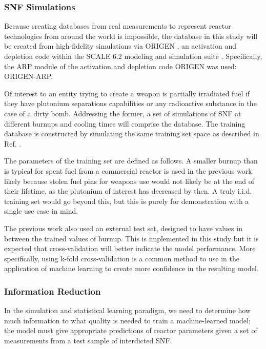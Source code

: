 \subsubsection{\gls{SNF} Simulations}
\label{sec:snfsim}

Because creating databases from real measurements to represent reactor
technologies from around the world is impossible, the database in this study
will be created from high-fidelity simulations via \gls{ORIGEN} \cite{origen},
an activation and depletion code within the SCALE 6.2 modeling and simulation
suite \cite{scale}. Specifically, the ARP module of the activation and
depletion code ORIGEN was used: \gls{ORIGEN-ARP}.

Of interest to an entity trying to create a weapon is partially irradiated fuel
if they have plutonium separations capabilities or any radioactive substance in
the case of a dirty bomb.  Addressing the former, a set of simulations of
\gls{SNF} at different burnups and cooling times will comprise the database.
The training database is constructed by simulating the same training set space
as described in Ref. \cite{dayman_feasibility_2013}. 

The parameters of the training set are defined as follows. A smaller burnup
than is typical for spent fuel from a commercial reactor is used in the
previous work likely because stolen fuel pins for weapons use would not likely
be at the end of their lifetime, as the plutonium of interest has decreased by
then. A truly i.i.d. training set would go beyond this, but this is purely for
demonstration with a single use case in mind. 

The previous work also used an external test set, designed to have values in
between the trained values of burnup. This is implemented in this study but it
is expected that cross-validation will better indicate the model performance.
More specifically, using k-fold cross-validation is a common method to use in
the application of machine learning to create more confidence in the resulting
model. 

\subsubsection{Information Reduction}
\label{sec:inforeduc}

In the simulation and statistical learning paradigm, we need to determine how
much information to what quality is needed to train a machine-learned model;
the model must give appropriate predictions of reactor parameters given a set
of measurements from a test sample of interdicted \gls{SNF}. 

